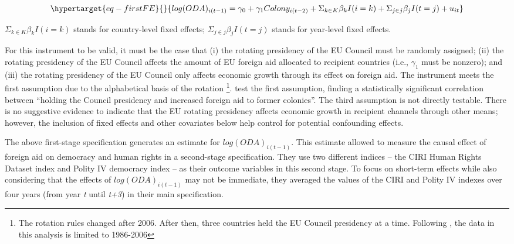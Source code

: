 \documentclass[12pt, ]{article}
\begin{document}
\begin{equation}\protect\hypertarget{eq-firstFE}{}{
log(ODA)_{i(t-1)} = \gamma_{0} + \gamma_{1}Colony_{i(t-2)} + \Sigma_{k \in K} \beta_{k}I(i=k) +\Sigma_{j \in j} \beta_{j}I(t=j) + u_{it}
}\label{eq-firstFE}\end{equation}

\(\Sigma_{k \in K} \beta_{k}I(i=k)\) stands for country-level fixed
effects; \(\Sigma_{j \in j} \beta_{j}I(t=j)\) stands for year-level
fixed effects.

For this instrument to be valid, it must be the case that (i) the
rotating presidency of the EU Council must be randomly assigned; (ii)
the rotating presidency of the EU Council affects the amount of EU
foreign aid allocated to recipient countries (i.e., \(\gamma_{1}\) must
be nonzero); and (iii) the rotating presidency of the EU Council only
affects economic growth through its effect on foreign aid. The
instrument meets the first assumption due to the alphabetical basis of
the rotation \footnote{The rotation rules changed after 2006. After
  then, three countries held the EU Council presidency at a time.
  Following \citet{carnegie2017foreign}, the data in this analysis is
  limited to 1986-2006}. \citet{carnegie2017foreign} test the first
assumption, finding a statistically significant correlation between
``holding the Council presidency and increased foreign aid to former
colonies''. The third assumption is not directly testable. There is no
suggestive evidence to indicate that the EU rotating presidency affects
economic growth in recipient channels through other means; however, the
inclusion of fixed effects and other covariates below help control for
potential confounding effects.

The above first-stage specification generates an estimate for
\(log(ODA)_{i(t-1)}\). This estimate allowed \citet{carnegie2017foreign}
to measure the causal effect of foreign aid on democracy and human
rights in a second-stage specification. They use two different indices
-- the CIRI Human Rights Dataset index and Polity IV democracy index --
as their outcome variables in this second stage. To focus on short-term
effects while also considering that the effects of \(log(ODA)_{i(t-1)}\)
may not be immediate, they averaged the values of the CIRI and Polity IV
indexes over four years (from year \emph{t} until \emph{t+3}) in their
main specification.
\end{document}
